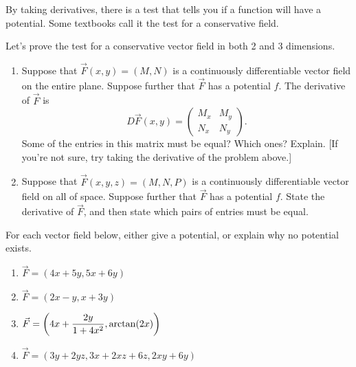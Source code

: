 {By taking derivatives, there is a test that tells you if a function will have a potential. Some textbooks call it the test for a conservative field.  
\begin{problem}\label{test for a conservative field}
Let's prove the test for a conservative vector field in both 2 and 3 dimensions.
\begin{enumerate}
 \item  Suppose that $\vec F(x,y)=(M,N)$ is a continuously differentiable vector field on the entire plane.  Suppose further that $\vec F$ has a potential $f$.  The derivative of $\vec F$ is $$D\vec F(x,y) = 
\begin{pmatrix}
M_x&M_y\\
N_x&N_y                                                                                                                                                                                \end{pmatrix}.
$$
Some of the entries in this matrix must be equal?  Which ones? Explain. [If you're not sure, try taking the derivative of the problem above.]

\item Suppose that $\vec F(x,y,z)=(M,N,P)$ is a continuously differentiable vector field on all of space.  Suppose further that $\vec F$ has a potential $f$.  State the derivative of $\vec F$, and then state which pairs of entries must be equal. 
\end{enumerate}
\end{problem}


\begin{problem}
For each vector field below, either give a potential, or explain why no potential exists.
\begin{enumerate}
 \item $\vec F=(4x+5y,5x+6y)$
 \item $\vec F= (2x-y,x+3y)$
 \item $\displaystyle\vec F= \left(4x+\frac{2y}{1+4x^2},\arctan(2x)\right)$
 \item $\vec F= (3y+2yz, 3x+2xz+6z,2xy+6y)$ 
\end{enumerate}
\end{problem}


}
